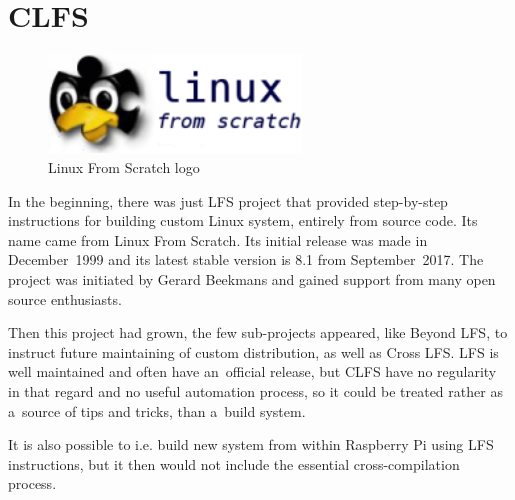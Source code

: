 \documentclass[printmode]{mgr}
\begin{document}


\section{CLFS}

\begin{figure}[htbp]
  \centering
    \includegraphics[width=0.6\textwidth]{lfs-logo.png}
    \caption{Linux From Scratch logo}
  \label{fig:lfs-logo}
\end{figure}


In the beginning, there was just LFS project that provided step-by-step instructions for building custom Linux system, entirely from source code.
Its name came from Linux From Scratch.
Its initial release was made in December~1999 and its latest stable version is 8.1 from September~2017. The project was initiated by Gerard Beekmans and gained support from many open source enthusiasts.

Then this project had grown, the few sub-projects appeared, like Beyond LFS, to instruct future maintaining of custom distribution, as well as Cross LFS.
LFS is well maintained and often have an~official release, but CLFS have no regularity in that regard and no useful automation process, so it could be treated rather as a~source of tips and tricks, than a~build system.

It is also possible to i.e. build new system from within Raspberry Pi using LFS instructions, but it then would not include the essential cross-compilation process.


\end{document}
